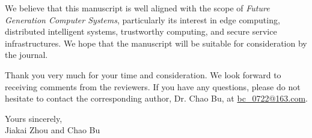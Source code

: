 \documentclass[10pt]{article}
\begin{document}
We believe that this manuscript is well aligned with the scope of \textit{Future Generation Computer Systems}, particularly its interest in edge computing, distributed intelligent systems, trustworthy computing, and secure service infrastructures. We hope that the manuscript will be suitable for consideration by the journal.

Thank you very much for your time and consideration. We look forward to receiving comments from the reviewers. If you have any questions, please do not hesitate to contact the corresponding author, Dr. Chao Bu, at \href{mailto:bc_0722@163.com}{bc\_0722@163.com}.

Yours sincerely,\\[1.2em]
Jiakai Zhou and Chao Bu
\end{document}
